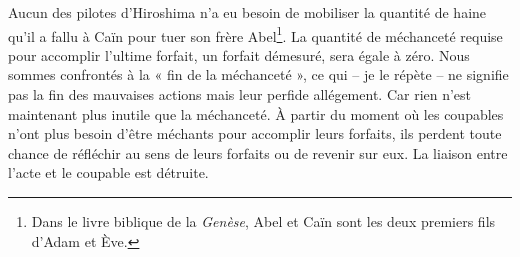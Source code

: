 {Aucun des pilotes d’Hiroshima n’a eu besoin de mobiliser la quantité de haine qu’il a fallu à Caïn pour tuer son frère Abel\footnote{Dans le livre biblique de la \emph{Genèse}, Abel et Caïn sont les deux premiers fils d’Adam et Ève.}. La quantité de méchanceté requise pour accomplir l’ultime forfait, un forfait démesuré, sera égale à zéro. Nous sommes confrontés à la « fin de la méchanceté », ce qui – je le répète – ne signifie pas la fin des mauvaises actions mais leur perfide allégement. Car rien n’est maintenant plus inutile que la méchanceté. À partir du moment où les coupables n’ont plus besoin d’être méchants pour accomplir leurs forfaits, ils perdent toute chance de réfléchir au sens de leurs forfaits ou de revenir sur eux. La liaison entre l’acte et le coupable est détruite.}


